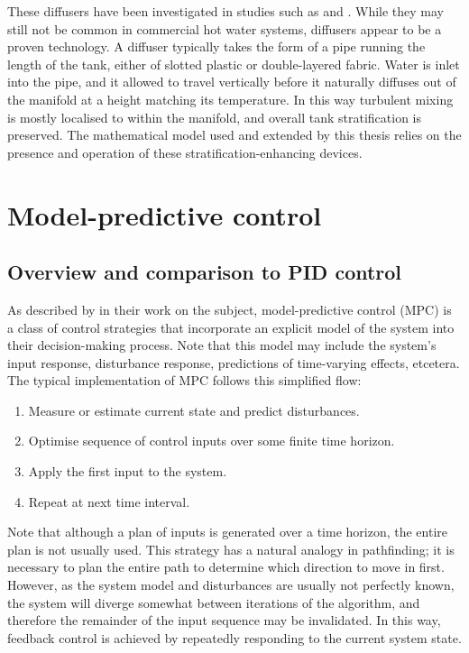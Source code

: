 These diffusers have been investigated in studies such as \textcite{Andersen08} and \textcite{Gari82}.
While they may still not be common in commercial hot water systems, diffusers appear to be a proven technology.
A diffuser typically takes the form of a pipe running the length of the tank, either of slotted plastic or double-layered fabric.
Water is inlet into the pipe, and it allowed to travel vertically before it naturally diffuses out of the manifold at a height matching its temperature.
In this way turbulent mixing is mostly localised to within the manifold, and overall tank stratification is preserved.
The mathematical model used and extended by this thesis relies on the presence and operation of these stratification-enhancing devices.

\section{Model-predictive control}

\subsection{Overview and comparison to PID control}

As described by \textcite{Camacho04} in their work on the subject, model-predictive control (MPC) is a class of control strategies that incorporate an explicit model of the system into their decision-making process.
Note that this model may include the system's input response, disturbance response, predictions of time-varying effects, etcetera.
The typical implementation of MPC follows this simplified flow:

\begin{enumerate}
   \item Measure or estimate current state and predict disturbances.
   \item Optimise sequence of control inputs over some finite time horizon.
   \item Apply the first input to the system.
   \item Repeat at next time interval.
\end{enumerate}

Note that although a plan of inputs is generated over a time horizon, the entire plan is not usually used.
This strategy has a natural analogy in pathfinding; it is necessary to plan the entire path to determine which direction to move in first.
However, as the system model and disturbances are usually not perfectly known, the system will diverge somewhat between iterations of the algorithm, and therefore the remainder of the input sequence may be invalidated.
In this way, feedback control is achieved by repeatedly responding to the current system state.

